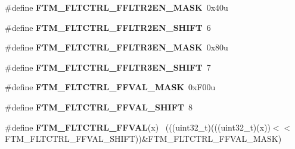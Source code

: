 \begin{DoxyCompactItemize}
\item 
\hypertarget{group___f_t_m___register___masks_gaf2c71dfc0e67908acb3818cdb38f7097}{}\#define {\bfseries F\+T\+M\+\_\+\+F\+L\+T\+C\+T\+R\+L\+\_\+\+F\+F\+L\+T\+R2\+E\+N\+\_\+\+M\+A\+S\+K}~0x40u\label{group___f_t_m___register___masks_gaf2c71dfc0e67908acb3818cdb38f7097}

\item 
\hypertarget{group___f_t_m___register___masks_ga74a686a0b3a50cc05515e7948446722e}{}\#define {\bfseries F\+T\+M\+\_\+\+F\+L\+T\+C\+T\+R\+L\+\_\+\+F\+F\+L\+T\+R2\+E\+N\+\_\+\+S\+H\+I\+F\+T}~6\label{group___f_t_m___register___masks_ga74a686a0b3a50cc05515e7948446722e}

\item 
\hypertarget{group___f_t_m___register___masks_gae2c942a53916267eea52d5eaa1fd9db0}{}\#define {\bfseries F\+T\+M\+\_\+\+F\+L\+T\+C\+T\+R\+L\+\_\+\+F\+F\+L\+T\+R3\+E\+N\+\_\+\+M\+A\+S\+K}~0x80u\label{group___f_t_m___register___masks_gae2c942a53916267eea52d5eaa1fd9db0}

\item 
\hypertarget{group___f_t_m___register___masks_ga03854a8ffab858afd4a9594b185faead}{}\#define {\bfseries F\+T\+M\+\_\+\+F\+L\+T\+C\+T\+R\+L\+\_\+\+F\+F\+L\+T\+R3\+E\+N\+\_\+\+S\+H\+I\+F\+T}~7\label{group___f_t_m___register___masks_ga03854a8ffab858afd4a9594b185faead}

\item 
\hypertarget{group___f_t_m___register___masks_gaca5b1d8eaedb1a55c4cc3be2d17ac80d}{}\#define {\bfseries F\+T\+M\+\_\+\+F\+L\+T\+C\+T\+R\+L\+\_\+\+F\+F\+V\+A\+L\+\_\+\+M\+A\+S\+K}~0x\+F00u\label{group___f_t_m___register___masks_gaca5b1d8eaedb1a55c4cc3be2d17ac80d}

\item 
\hypertarget{group___f_t_m___register___masks_gae69c26ba52bfb04edf52ec6574af426e}{}\#define {\bfseries F\+T\+M\+\_\+\+F\+L\+T\+C\+T\+R\+L\+\_\+\+F\+F\+V\+A\+L\+\_\+\+S\+H\+I\+F\+T}~8\label{group___f_t_m___register___masks_gae69c26ba52bfb04edf52ec6574af426e}

\item 
\hypertarget{group___f_t_m___register___masks_ga451622deece1d10900d70037e439bbd4}{}\#define {\bfseries F\+T\+M\+\_\+\+F\+L\+T\+C\+T\+R\+L\+\_\+\+F\+F\+V\+A\+L}(x)                                      ~(((uint32\+\_\+t)(((uint32\+\_\+t)(x))$<$$<$F\+T\+M\+\_\+\+F\+L\+T\+C\+T\+R\+L\+\_\+\+F\+F\+V\+A\+L\+\_\+\+S\+H\+I\+F\+T))\&F\+T\+M\+\_\+\+F\+L\+T\+C\+T\+R\+L\+\_\+\+F\+F\+V\+A\+L\+\_\+\+M\+A\+S\+K)\label{group___f_t_m___register___masks_ga451622deece1d10900d70037e439bbd4}


\end{DoxyCompactItemize}
